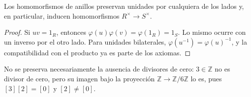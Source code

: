 \begin{prop}
Los homomorfismos de anillos preservan unidades por cualquiera de los lados y, en particular, inducen homomorfismos $R^\times\to S^\times$.
\end{prop}
\begin{proof}
Si $uv=1_R$, entonces $\varphi(u)\varphi(v)=\varphi(1_R)=1_S$. Lo mismo ocurre con un inverso por el otro lado. Para unidades bilaterales, $\varphi(u^{-1})=\varphi(u)^{-1}$, y la compatibilidad con el producto ya es parte de los axiomas.
\end{proof}
\begin{ejem}
No se preserva necesariamente la ausencia de divisores de cero: $3\in\mathbb Z$ no es divisor de cero, pero su imagen bajo la proyección $\mathbb Z\to\mathbb Z/6\mathbb Z$ lo es, pues $[3][2]=[0]$ y $[2]\ne[0]$.
\end{ejem}
